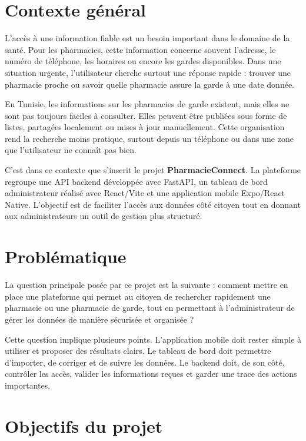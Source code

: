 \section*{Contexte général}

L'accès à une information fiable est un besoin important dans le domaine de la santé. Pour les
pharmacies, cette information concerne souvent l'adresse, le numéro de téléphone, les horaires ou encore
les gardes disponibles. Dans une situation urgente, l'utilisateur cherche surtout une réponse rapide :
trouver une pharmacie proche ou savoir quelle pharmacie assure la garde à une date donnée.

En Tunisie, les informations sur les pharmacies de garde existent, mais elles ne sont pas toujours
faciles à consulter. Elles peuvent être publiées sous forme de listes, partagées localement ou mises à jour
manuellement. Cette organisation rend la recherche moins pratique, surtout depuis un téléphone ou dans
une zone que l'utilisateur ne connaît pas bien.

C'est dans ce contexte que s'inscrit le projet \textbf{PharmacieConnect}. La plateforme regroupe une API
backend développée avec FastAPI, un tableau de bord administrateur réalisé avec React/Vite et une
application mobile Expo/React Native. L'objectif est de faciliter l'accès aux données côté citoyen tout en
donnant aux administrateurs un outil de gestion plus structuré.

\section*{Problématique}

La question principale posée par ce projet est la suivante : comment mettre en place une plateforme qui
permet au citoyen de rechercher rapidement une pharmacie ou une pharmacie de garde, tout en permettant
à l'administrateur de gérer les données de manière sécurisée et organisée ?

Cette question implique plusieurs points. L'application mobile doit rester simple à utiliser et proposer
des résultats clairs. Le tableau de bord doit permettre d'importer, de corriger et de suivre les données.
Le backend doit, de son côté, contrôler les accès, valider les informations reçues et garder une trace des
actions importantes.

\section*{Objectifs du projet}

